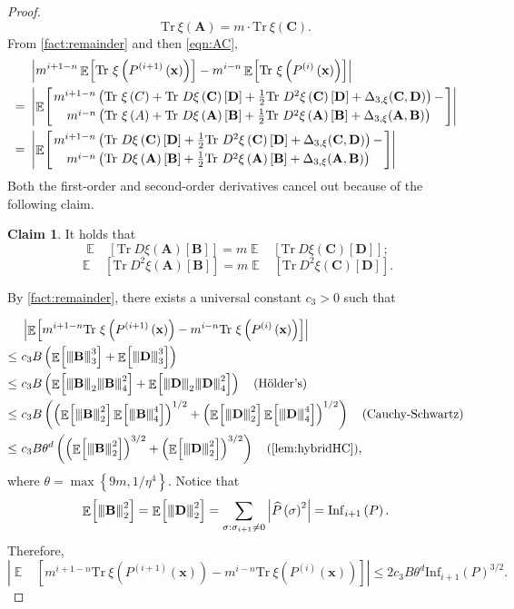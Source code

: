 \documentclass[10pt,a4paper]{article}
\theoremstyle{plain}
\theoremstyle{definition}
\newtheorem{claim}[theorem]{Claim}
\newcommand {\minusspace} {\: \! \!}
\newcommand {\Fn} [2] {\ensuremath{ #1 \minusspace \Br{ #2 } }}
\newcommand {\set} [1] {\ensuremath{ \left\lbrace #1 \right\rbrace }}
\newcommand {\br} [1] {\ensuremath{ \left( #1 \right) }}
\newcommand {\Br} [1] {\ensuremath{ \left[ #1 \right] }}
\newcommand {\ab} [1] {\ensuremath{ \left| #1 \right| }}
\DeclareMathOperator*{\bigE}{\mathbb{E}}
\newcommand {\expec} [2] {\Fn{\bigE_{\substack{#1}}}{#2}}
\newcommand{\nnorm}[1]{{\left\vert\kern-0.25ex\left\vert\kern-0.25ex\left\vert #1
		\right\vert\kern-0.25ex\right\vert\kern-0.25ex\right\vert}}
\newcommand {\Tr} {\ensuremath{ \mathrm{Tr} }}
\newcommand{\randx}{\ensuremath{\mathbf{x}}}
\newcommand{\randA}{\ensuremath{\mathbf{A}}}
\newcommand{\randB}{\ensuremath{\mathbf{B}}}
\newcommand{\randC}{\ensuremath{\mathbf{C}}}
\newcommand{\randD}{\ensuremath{\mathbf{D}}}
\newcommand{\1}{\mathbb{1}} %
\begin{document}
\begin{proof}
\begin{equation}\label{eqn:AC}
\Tr~\xi\br{\mathbf{A}}=m\cdot\Tr~\xi\br{\mathbf{C}}.
\end{equation}
From \cref{fact:remainder} and then \cref{eqn:AC},
	\begin{align*} &\ab{m^{i+1-n}\expec{}{\Tr~\xi\br{P^{\br{i+1}}\br{\randx}}}-m^{i-n}\expec{}{\Tr~\xi\br{P^{\br{i}}\br{\randx}}}}\\
 =~&\ab{\expec{}{\genfrac{}{}{0pt}{}{ m^{i+1-n}\br{\Tr~\xi\br{C}+\Tr~D\xi\br{\mathbf{C}}\Br{\mathbf{D}}+\frac{1}{2}\Tr~D^2\xi\br{\mathbf{C}}\Br{\mathbf{D}}+\Delta_{3,\xi}(\randC,\randD)}-}{ m^{i-n}\br{\Tr~\xi\br{A}+\Tr~D\xi\br{\mathbf{A}}\Br{\mathbf{B}}+\frac{1}{2}\Tr~D^2\xi\br{\mathbf{A}}\Br{\mathbf{B}}+\Delta_{3,\xi}(\randA,\randB)}}}}\\
	=~&\ab{\expec{}{\genfrac{}{}{0pt}{}{ m^{i+1-n}\br{\Tr~D\xi\br{\mathbf{C}}\Br{\mathbf{D}}+\frac{1}{2}\Tr~D^2\xi\br{\mathbf{C}}\Br{\mathbf{D}}+\Delta_{3,\xi}(\randC,\randD)}-}{ m^{i-n}\br{\Tr~D\xi\br{\mathbf{A}}\Br{\mathbf{B}}+\frac{1}{2}\Tr~D^2\xi\br{\mathbf{A}}\Br{\mathbf{B}}+\Delta_{3,\xi}(\randA,\randB)}}}}
\end{align*}
Both the first-order and second-order derivatives cancel out because of the following claim.
\begin{claim}\label{claim:1}
	It holds that
	\[\expec{}{\Tr~D\xi\br{\mathbf{A}}\Br{\mathbf{B}}}=m\expec{}{\Tr~D\xi\br{\mathbf{C}}\Br{\mathbf{D}}};\]	\[\expec{}{\Tr~D^2\xi\br{\mathbf{A}}\Br{\mathbf{B}}}=m\expec{}{\Tr~D^2\xi\br{\mathbf{C}}\Br{\mathbf{D}}}.\]		
\end{claim}
\bigskip
By \cref{fact:remainder}, there exists a universal constant $c_3>0$ such that

\begin{align*}
&\ab{\expec{}{m^{i+1-n}\Tr~\xi\br{P^{\br{i+1}}\br{\randx}}-m^{i-n}\Tr~\xi\br{P^{\br{i}}\br{\randx}}}}\\
\leq ~&c_3 B \br{\expec{}{\nnorm{\randB}_3^3}+\expec{}{\nnorm{\randD}_3^3}}\\
\leq ~&c_3 B \br{\expec{}{\nnorm{\randB}_2\nnorm{\randB}_4^2}+\expec{}{\nnorm{\randD}_2\nnorm{\randD}_4^2}}\quad\mbox{(H\"older's)}\\
\leq ~&c_3 B \br{\br{\expec{}{\nnorm{\randB}_2^2}\expec{}{\nnorm{\randB}_4^4}}^{1/2}+\br{\expec{}{\nnorm{\randD}_2^2}\expec{}{\nnorm{\randD}_4^4}}^{1/2}}\quad\mbox{(Cauchy-Schwartz)}\\
\leq ~&c_3 B \theta^d\br{\br{\expec{}{\nnorm{\randB}_2^2}}^{3/2}+\br{\expec{}{\nnorm{\randD}_2^2}}^{3/2}}\quad\mbox{(\cref{lem:hybridHC})},
\end{align*}
where $\theta=\max\set{9m,1/\eta^4}$. Notice that
	\[\expec{}{\nnorm{\randB}_2^2}=\expec{}{\nnorm{\randD}_2^2}=\sum_{\sigma:\sigma_{i+1}\neq 0}\ab{\widehat{P}\br{\sigma}^2}=\mathrm{Inf}_{i+1}\br{P}.\]
	Therefore,	\[\ab{\expec{}{m^{i+1-n}\Tr~\xi\br{P^{\br{i+1}}\br{\randx}}-m^{i-n}\Tr~\xi\br{P^{\br{i}}\br{\randx}}}}\leq 2c_3 B \theta^d\mathrm{Inf}_{i+1}\br{P}^{3/2}.\]
	

\end{proof}
\end{document}
